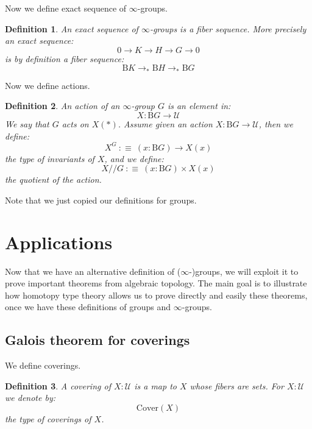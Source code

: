 \documentclass{article}
\newcommand{\se}[1]{\medbreak \medbreak \section{#1}}
\newcommand{\sse}[1]{\medbreak \subsection{#1}}
\newcommand{\U}{{\mathcal U}}
\renewcommand{\r}{\rightarrow}
\newcommand{\B}{\mathrm{B}}
\newtheorem{definition}{Definition}
\begin{document}
Now we define exact sequence of $\infty$-groups.

\begin{definition}
An exact sequence of $\infty$-groups is a fiber sequence. More precisely an exact sequence:
\[0\r K\r H\r G\r 0\]
is by definition a fiber sequence:
\[\B K\r_*\B H\r_*\B G\]
\end{definition}

Now we define actions.

\begin{definition}
An action of an $\infty$-group $G$ is an element in:
\[X : \B G \r \U\]
We say that $G$ acts on $X(*)$. Assume given an action $X:\B G \r \U$, then we define:
\[X^G \ :\equiv\ (x:\B G)\r X(x)\]
the type of invariants of $X$, and we define:
\[X//G \ :\equiv\ (x:\B G)\times X(x)\]
the quotient of the action. 
\end{definition}

Note that we just copied our definitions for groups.








\se{Applications}

Now that we have an alternative definition of ($\infty$-)groups, we will exploit it to prove important theorems from algebraic topology. The main goal is to illustrate how homotopy type theory allows us to prove directly and easily these theorems, once we have these definitions of groups and $\infty$-groups.



\sse{Galois theorem for coverings}

We define coverings.

\begin{definition}
A covering of $X:\U$ is a map to $X$ whose fibers are sets. For $X:\U$ we denote by:
\[\mathrm{Cover}(X)\]
the type of coverings of $X$.
\end{definition} 
\end{document}
